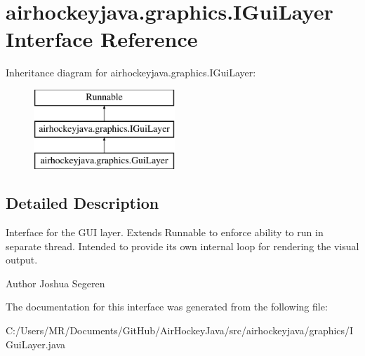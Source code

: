 \hypertarget{interfaceairhockeyjava_1_1graphics_1_1_i_gui_layer}{}\section{airhockeyjava.\+graphics.\+I\+Gui\+Layer Interface Reference}
\label{interfaceairhockeyjava_1_1graphics_1_1_i_gui_layer}
Inheritance diagram for airhockeyjava.\+graphics.\+I\+Gui\+Layer\+:\begin{figure}[H]
\begin{center}
\leavevmode
\includegraphics[height=3.000000cm]{interfaceairhockeyjava_1_1graphics_1_1_i_gui_layer}
\end{center}
\end{figure}


\subsection{Detailed Description}
Interface for the G\+U\+I layer. Extends Runnable to enforce ability to run in separate thread. Intended to provide its own internal loop for rendering the visual output.

\begin{DoxyAuthor}{Author}
Joshua Segeren 
\end{DoxyAuthor}


The documentation for this interface was generated from the following file\+:\begin{DoxyCompactItemize}
\item 
C\+:/\+Users/\+M\+R/\+Documents/\+Git\+Hub/\+Air\+Hockey\+Java/src/airhockeyjava/graphics/I\+Gui\+Layer.\+java\end{DoxyCompactItemize}

